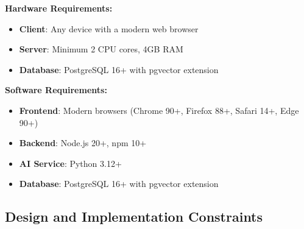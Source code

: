 \documentclass[11pt,a4paper]{article}
\begin{document}
\textbf{Hardware Requirements:}
\begin{itemize}
    \item \textbf{Client}: Any device with a modern web browser
    \item \textbf{Server}: Minimum 2 CPU cores, 4GB RAM
    \item \textbf{Database}: PostgreSQL 16+ with pgvector extension
\end{itemize}

\textbf{Software Requirements:}
\begin{itemize}
    \item \textbf{Frontend}: Modern browsers (Chrome 90+, Firefox 88+, Safari 14+, Edge 90+)
    \item \textbf{Backend}: Node.js 20+, npm 10+
    \item \textbf{AI Service}: Python 3.12+
    \item \textbf{Database}: PostgreSQL 16+ with pgvector extension
\end{itemize}

\subsection{Design and Implementation Constraints}
\end{document}
